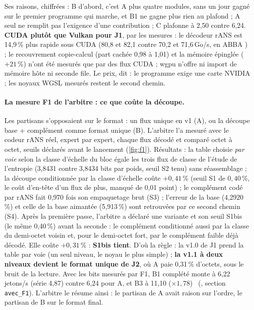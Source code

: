 Ses raisons, chiffrées : B d'abord, c'est A plus quatre modules, sans un jour gagné sur le premier programme qui marche, et B1 ne gagne plus rien au plafond ; A seul ne remplit pas l'exigence d'une contribution ; C plafonne à 2,50 contre 6,24. \textbf{CUDA plutôt que Vulkan pour J1}, par les mesures : le décodeur rANS est 14,9\,\% plus rapide sous CUDA (80,8 et 82,1 contre 70,2 et 71,6\,Go/s, en ABBA \mes) ; le recouvrement copie-calcul (part cachée 0,98 à 1,01) et la mémoire épinglée ($+21\,\%$) n'ont été mesurés que par des flux CUDA ; wgpu n'offre ni import de mémoire hôte ni seconde file. Le prix, dit : le programme exige une carte NVIDIA ; les noyaux WGSL mesurés restent le second chemin.

\paragraph{La mesure F1 de l'arbitre : ce que coûte la découpe.} Les partisans s'opposaient sur le format : un flux unique en v1 (A), ou la découpe base + complément comme format unique (B). L'arbitre l'a mesuré avec le codeur rANS réel, expert par expert, chaque flux décodé et comparé octet à octet, seuils déclarés avant le lancement (\cref{fig:f1}). Résultats \mes : la table choisie \emph{par voie} selon la classe d'échelle du bloc égale les trois flux de classe de l'étude de l'entropie (3,8431 contre 3,8434 bits par poids, seuil S2 tenu) sans réassemblage ; la découpe conditionnée par la classe d'échelle coûte $+0{,}41\,\%$ (seuil S1 de $0{,}40\,\%$, le coût d'en-tête d'un flux de plus, manqué de 0,01 point) ; le complément codé par rANS fait 0,970 fois son empaquetage brut (S3) ; l'erreur de la base (4,2920\,\%) et celle de la base aimantée (5,913\,\%) sont retrouvées par ce second chemin (S4). Après la première passe, l'arbitre a déclaré une variante et son seuil S1bis (le même 0,40\,\%) avant la seconde : le complément conditionné aussi par la classe du demi-octet voisin et, pour le demi-octet fort, par le complément faible déjà décodé. Elle coûte $+0{,}31\,\%$ : \textbf{S1bis tient}. D'où la règle : la v1.0 de J1 prend la table par voie (un seul niveau, le noyau le plus simple) ; \textbf{la v1.1 à deux niveaux devient le format unique de J2}, où A paie 0,31\,\% d'octets, sous le bruit de la lecture. Avec les bits mesurés par F1, B1 complété monte à 6,22 jetons/s (série 4,87) contre 6,24 pour A, et B3 à 11,10 ($\times 1{,}78$) \calc~(, section \texttt{avec\_F1}). L'arbitre le résume ainsi : le partisan de A avait raison sur l'ordre, le partisan de B sur le format final.

